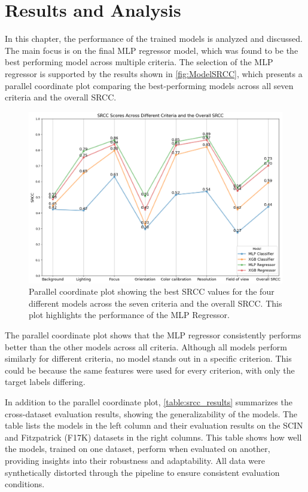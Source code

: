 \chapter{Results and Analysis}
\label{ch:ResultsAnalysis}
In this chapter, the performance of the trained models is analyzed and discussed. The main focus is on the final MLP regressor model, which was found to be the best performing model across multiple criteria. The selection of the MLP regressor is supported by the results shown in \autoref{fig:ModelSRCC}, which presents a parallel coordinate plot comparing the best-performing models across all seven criteria and the overall SRCC.\par
\begin{figure}[ht]
    \centering
    \includegraphics[keepaspectratio,width=15cm]{img/Model_SRCC.png}
    \caption{Parallel coordinate plot showing the best SRCC values for the four different models across the seven criteria and the overall SRCC. This plot highlights the performance of the MLP Regressor.}
    \label{fig:ModelSRCC}
\end{figure}
\noindent
The parallel coordinate plot shows that the MLP regressor consistently performs better than the other models across all criteria. Although all models perform similarly for different criteria, no model stands out in a specific criterion. This could be because the same features were used for every criterion, with only the target labels differing. \par
\vspace{\baselineskip}
\noindent
In addition to the parallel coordinate plot, \autoref{table:srcc_results} summarizes the cross-dataset evaluation results, showing the generalizability of the models. The table lists the models in the left column and their evaluation results on the SCIN and Fitzpatrick (F17K) datasets in the right columns. This table shows how well the models, trained on one dataset, perform when evaluated on another, providing insights into their robustness and adaptability. All data were synthetically distorted through the pipeline to ensure consistent evaluation conditions. \par
